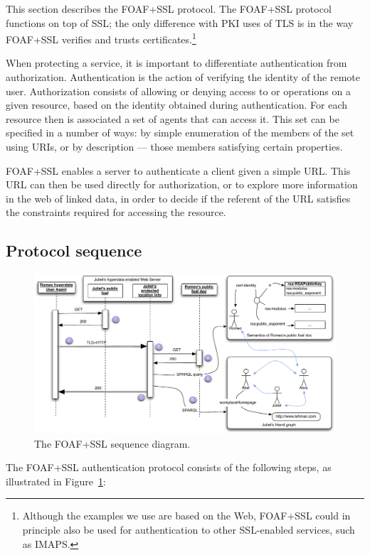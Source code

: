 \documentclass{llncs}
\begin{document}
This section describes the FOAF+SSL protocol.  The FOAF+SSL protocol
functions on top of SSL; the only difference with PKI uses of TLS is
in the way FOAF+SSL verifies and trusts
certificates.\footnote{Although the examples we use are based on the
  Web, FOAF+SSL could in principle also be used for authentication to
  other SSL-enabled services, such as IMAPS.}

When protecting a service, it is important to differentiate
authentication from authorization.  Authentication is the action of
verifying the identity of the remote user.  Authorization consists of
allowing or denying access to or operations on a given resource, based
on the identity obtained during authentication. For each resource then
is associated a set of agents that can access it. This set can be
specified in a number of ways: by simple enumeration of the members of
the set using URIs, or by description --- those members satisfying
certain properties.

FOAF+SSL enables a server to authenticate a client given a simple
URL. This URL can then be used directly for authorization, or to
explore more information in the web of linked data, in order to decide
if the referent of the URL satisfies the constraints required for
accessing the resource.

\subsection{Protocol sequence}
\label{sec:foafsslprotseq}

\begin{figure}[htbp]
\centering\includegraphics[width=\columnwidth]{figures/foaf_ssl_sequence}
\caption{The FOAF+SSL sequence diagram.}
\label{fig:foafsslseqdiag}
\end{figure}

The FOAF+SSL authentication protocol consists of the following steps,
as illustrated in Figure~\ref{fig:foafsslseqdiag}:
\end{document}
